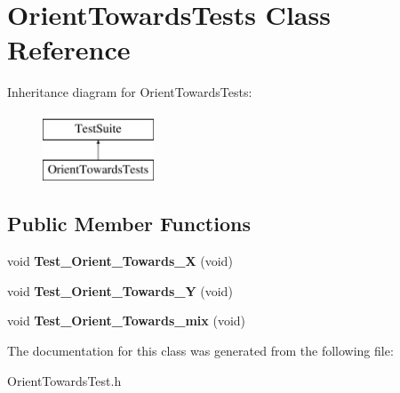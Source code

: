 \hypertarget{classOrientTowardsTests}{\section{Orient\-Towards\-Tests Class Reference}
\label{classOrientTowardsTests}
}
Inheritance diagram for Orient\-Towards\-Tests\-:\begin{figure}[H]
\begin{center}
\leavevmode
\includegraphics[height=2.000000cm]{classOrientTowardsTests}
\end{center}
\end{figure}
\subsection*{Public Member Functions}
\begin{DoxyCompactItemize}
\item 
\hypertarget{classOrientTowardsTests_aad8bf784367ef05179bc41953751e9dc}{void {\bfseries Test\-\_\-\-Orient\-\_\-\-Towards\-\_\-\-X} (void)}\label{classOrientTowardsTests_aad8bf784367ef05179bc41953751e9dc}

\item 
\hypertarget{classOrientTowardsTests_afd244516e96fb1f259d62a6800643e98}{void {\bfseries Test\-\_\-\-Orient\-\_\-\-Towards\-\_\-\-Y} (void)}\label{classOrientTowardsTests_afd244516e96fb1f259d62a6800643e98}

\item 
\hypertarget{classOrientTowardsTests_a0f95a189c1ae146868005eb6eb1c27d1}{void {\bfseries Test\-\_\-\-Orient\-\_\-\-Towards\-\_\-mix} (void)}\label{classOrientTowardsTests_a0f95a189c1ae146868005eb6eb1c27d1}

\end{DoxyCompactItemize}


The documentation for this class was generated from the following file\-:\begin{DoxyCompactItemize}
\item 
Orient\-Towards\-Test.\-h\end{DoxyCompactItemize}
